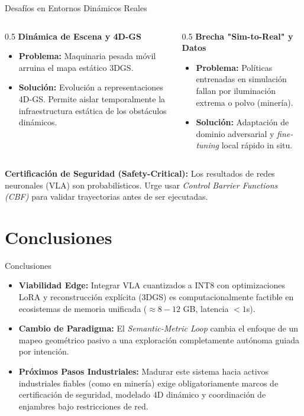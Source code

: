 \documentclass[aspectratio=169]{beamer}
\begin{document}
	\begin{frame}{Desafíos en Entornos Dinámicos Reales}
		\begin{columns}
			\begin{column}{0.5\textwidth}
				\textbf{Dinámica de Escena y 4D-GS}
				\begin{itemize}
					\item \textbf{Problema:} Maquinaria pesada móvil arruina el mapa estático 3DGS.
					\item \textbf{Solución:} Evolución a representaciones 4D-GS. Permite aislar temporalmente la infraestructura estática de los obstáculos dinámicos.
				\end{itemize}
			\end{column}
			\begin{column}{0.5\textwidth}
				\textbf{Brecha "Sim-to-Real" y Datos}
				\begin{itemize}
					\item \textbf{Problema:} Políticas entrenadas en simulación fallan por iluminación extrema o polvo (minería).
					\item \textbf{Solución:} Adaptación de dominio adversarial y \textit{fine-tuning} local rápido in situ.
				\end{itemize}
			\end{column}
		\end{columns}
		
		\vspace{2ex}
		\textbf{Certificación de Seguridad (Safety-Critical):} Los resultados de redes neuronales (VLA) son probabilísticos. Urge usar \textit{Control Barrier Functions (CBF)} para validar trayectorias antes de ser ejecutadas.
	\end{frame}
	
	\section{Conclusiones}
	
	\begin{frame}{Conclusiones}
		\justifying
		\begin{itemize}
			\item \textbf{Viabilidad Edge:} Integrar VLA cuantizados a INT8 con optimizaciones LoRA y reconstrucción explícita (3DGS) es computacionalmente factible en ecosistemas de memoria unificada ($\approx 8-12$ GB, latencia $< 1$s).
			\item \textbf{Cambio de Paradigma:} El \textit{Semantic-Metric Loop} cambia el enfoque de un mapeo geométrico pasivo a una exploración completamente autónoma guiada por intención.
			\item \textbf{Próximos Pasos Industriales:} Madurar este sistema hacia activos industriales fiables (como en minería) exige obligatoriamente marcos de certificación de seguridad, modelado 4D dinámico y coordinación de enjambres bajo restricciones de red.
		\end{itemize}
	\end{frame}
	
	\begin{frame}

	\end{frame}
	
\end{document}
